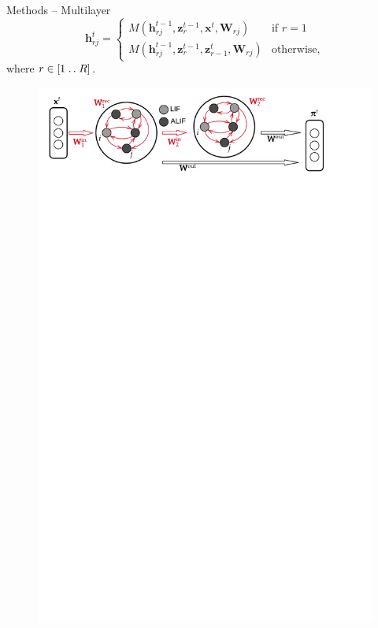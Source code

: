 \documentclass[t]{beamer}
\begin{document}
\begin{frame}{Methods -- Multilayer}
  \begin{equation}\label{eq:ml_model}
        \mathbf{h}^t_{rj} = \begin{cases}
        M\left(\mathbf{h}_{rj}^{t-1}, \mathbf{z}_r^{t-1}, \mathbf{x}^t, \mathbf{W}_{rj}\right)       & \mbox{if } r = 1\\
        M\left(\mathbf{h}_{rj}^{t-1}, \mathbf{z}_r^{t-1}, \mathbf{z}_{r-1}^t, \mathbf{W}_{rj}\right) & \mbox{otherwise,}
        \end{cases}
        \end{equation}
        where $r \in [1\mathrel{{.}\,{.}}\nobreak R]$.

  \begin{figure}[!ht]
    \centering
    \includegraphics[trim=0 25cm 0 0, clip, width=\linewidth]{Multilayer}
  \end{figure}
\end{frame}
\end{document}
